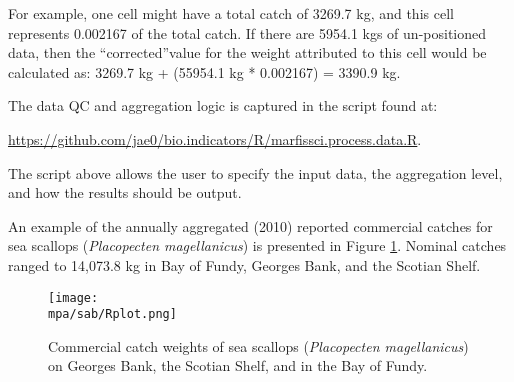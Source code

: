 \documentclass[letterpaper,portrait,11pt]{scrartcl}
\numberwithin{equation}{section}		%
\numberwithin{figure}{section}		%
\numberwithin{table}{section}				%
\newcommand*{\D}{.}
\newcommand{\biodata}{\string~/bio\D data}   %
\newcommand{\mpa}{\biodata/bio\D indicators/mpa}  %
\begin{document}
For example, one cell might have a total catch of 3269.7 kg, and this cell represents 0.002167 of the total catch.  If there are 5954.1 kgs of un-positioned data, then the \textquotedblleft corrected\textquotedblright value for the weight attributed to this cell would be calculated as:
3269.7 kg + (55954.1 kg * 0.002167) = 3390.9 kg.


The data QC and aggregation logic is captured in the script found at: 

\url{https://github.com/jae0/bio.indicators/R/marfissci.process.data.R}.

The script above allows the user to specify the input data, the aggregation level, and how the results should be output.

An example of the annually aggregated (2010) reported commercial catches for sea scallops (\textit{Placopecten magellanicus}) is presented in Figure \ref{fig:Scallop}. Nominal catches ranged to 14,073.8  kg in Bay of Fundy, Georges Bank, and the Scotian Shelf.











\begin{figure}[h]
	\centering
 \texttt{[image: \\mpa/sab/Rplot.png]}
	\caption{Commercial catch weights of sea scallops (\textit{Placopecten magellanicus}) on Georges Bank, the Scotian Shelf, and in the Bay of Fundy.}
		\label{fig:Scallop}
\end{figure}
\end{document}
